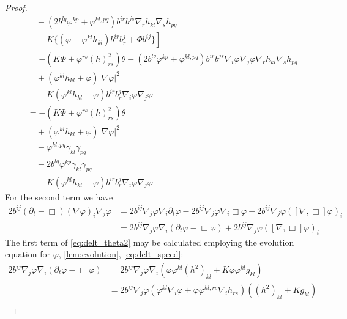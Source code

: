 \documentclass{amsart}
\begin{document}
\begin{proof}
\begin{equation}
\begin{split}
& \quad - \left(2b^{lq}\varphi^{kp} + \varphi^{kl,pq}\right) b^{ir}b^{js} \nabla_r h_{kl} \nabla_s h_{pq} \\
& \quad - \left. K \{(\varphi + \varphi^{kl}h_{kl}) b^{ir}b^{j}_{r} + \Phi b^{ij}\}\right] \\
&= - \left(K\Phi + \varphi^{rs}(h)^2_{rs}\right) \theta - (2b^{lq}\varphi^{kp} + \varphi^{kl,pq}) b^{ir}b^{js}\nabla_i\varphi\nabla_j\varphi\nabla_rh_{kl}\nabla_s h_{pq} \\
&\quad + (\varphi^{kl}h_{kl} + \varphi)|\nabla\varphi|^{2} \\
&\quad - K(\varphi^{kl}h_{kl} + \varphi)b^{ir}b^{j}_{r}\nabla_i \varphi\nabla_j\varphi \\
&= - \left(K\Phi + \varphi^{rs}(h)^2_{rs}\right) \theta \\
&\quad + (\varphi^{kl}h_{kl} + \varphi)|\nabla\varphi|^{2} \\
&\quad - \varphi^{kl,pq} \gamma_{kl} \gamma_{pq} \\
&\quad - 2b^{lq}\varphi^{kp} \gamma_{kl} \gamma_{pq} \\
&\quad - K(\varphi^{kl}h_{kl} + \varphi)b^{ir}b^{j}_{r}\nabla_i \varphi\nabla_j\varphi
\end{split}
\end{equation}
For the second term we have
\begin{equation}
\label{eq:delt_theta2}
\begin{split}
2 b^{ij} (\partial_{t} - \Box) (\nabla\varphi)_i \nabla_j\varphi &= 2 b^{ij} \nabla_j \varphi \nabla_i \partial_{t} \varphi - 2 b^{ij} \nabla_j\varphi \nabla_i \Box \varphi + 2 b^{ij} \nabla_j \varphi ([\nabla, \Box] \varphi)_i \\
&= 2 b^{ij} \nabla_j \varphi \nabla_i (\partial_{t} \varphi - \Box \varphi) + 2 b^{ij} \nabla_j \varphi ([\nabla, \Box] \varphi)_i
\end{split}
\end{equation}
The first term of \cref{eq:delt_theta2} may be calculated employing the evolution equation for \(\varphi\), \cref{lem:evolution}, \cref{eq:delt_speed}:
\begin{equation}
\label{eq:delt_theta2a}
\begin{split}
2 b^{ij} \nabla_j \varphi \nabla_i (\partial_{t} \varphi - \Box\varphi) &= 2 b^{ij} \nabla_j \varphi \nabla_i (\varphi\varphi^{kl}(h^2)_{kl} + K \varphi\varphi^{kl}g_{kl}) \\
&= 2 b^{ij} \nabla_j \varphi (\varphi^{kl}\nabla_i \varphi + \varphi\varphi^{kl,rs} \nabla_i h_{rs})((h^2)_{kl} + K g_{kl}) \\

\end{split}
\end{equation}
\end{proof}
\end{document}
